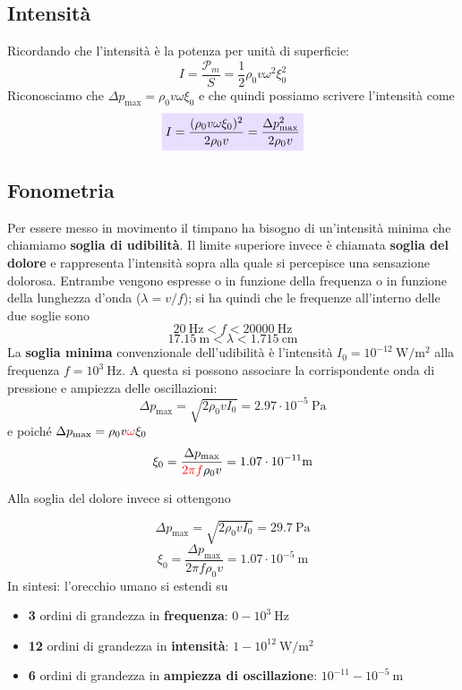 \documentclass[x11names]{report}
\newcommand{\viola}[1]{\colorbox{yred}{$\displaystyle #1$}}
\begin{document}
	\subsection{Intensità}
	Ricordando che l'intensità è la potenza per unità di superficie:
	\[ 
	I = \frac{\mathcal{P}_m }{S} =   \frac{1}{2} \rho_0 v \omega ^2 \xi_0^2
	\]
	Riconosciamo che \(\Delta p_{\text{max}} = \rho_0 v \omega  \xi_0\) e che quindi possiamo scrivere l'intensità come
	\begin{equation}\label{intensita_fono}
		\viola{I = \frac{(\rho_0 v \omega  \xi_0)^2}{2\rho_0 v} = \frac{\Delta p_{\text{max}}^2}{2\rho_0 v}}
	\end{equation}
	
	
	\subsection{Fonometria}
	Per essere messo in movimento il timpano ha bisogno di un'intensità minima che chiamiamo \textbf{soglia di udibilità}. Il limite superiore invece è chiamata \textbf{soglia del dolore} e rappresenta l'intensità sopra alla quale si percepisce una sensazione dolorosa. Entrambe vengono espresse o in funzione della frequenza o in funzione della lunghezza d'onda (\(\lambda=v/f\)); si ha quindi che le frequenze all'interno delle due soglie sono
	\[ 
	\SI{20}{\hertz} < f < \SI{20000}{\hertz}
	\]
	\[ 
	\SI{17.15}{\m} < \lambda < \SI{1.715}{\cm}
	\]
	La\textbf{ soglia minima} convenzionale dell'udibilità è l'intensità \(I_0 = 10^{-12}\SI{}{\watt/\m^2}\) alla frequenza  \(f = 10^3\SI{}{\hertz}\). A questa si possono associare la corrispondente onda di pressione e ampiezza delle oscillazioni:
	\[ 
	\Delta p_{\text{max}} = \sqrt{2\rho_0 v I_0} = 2.97 \cdot 10^{-5} \SI{}{\pascal}
	\]
	e poiché  \(\Delta p_{\text{max}} = \rho_0 v \textcolor{red}{\omega } \xi_0\)
	\[ 
	\xi_0 = \frac{\Delta p_{\text{max}}}{\textcolor{red}{2\pi f}\rho_0 v} = 1.07 \cdot 10^{-11}\SI{}{\m}
	\]
	
	Alla soglia del dolore invece si ottengono 
	
	\[ 
	\Delta p_{\text{max}} = \sqrt{2\rho_0 v I_0} = 29.7 \SI{}{\pascal}
	\]
	\[ 
	\xi_0 = \frac{\Delta p_{\text{max}}}{2\pi f\rho_0 v} = 1.07 \cdot 10^{-5}\SI{}{\m}
	\]
	In sintesi: l'orecchio umano si estendi su
	\begin{itemize}
		\item \textbf{3} ordini di grandezza in \textbf{frequenza}: \(0 - 10^3 \SI{}{\hertz}\)
		\item \textbf{12} ordini di grandezza in \textbf{intensità}: \(1 - 10^12 \SI{}{\watt/\m^2}\)
		\item \textbf{6} ordini di grandezza in \textbf{ampiezza di oscillazione}: \(10^{-11} - 10^{-5} \SI{}{\m}\)
	\end{itemize}
	
\end{document}
